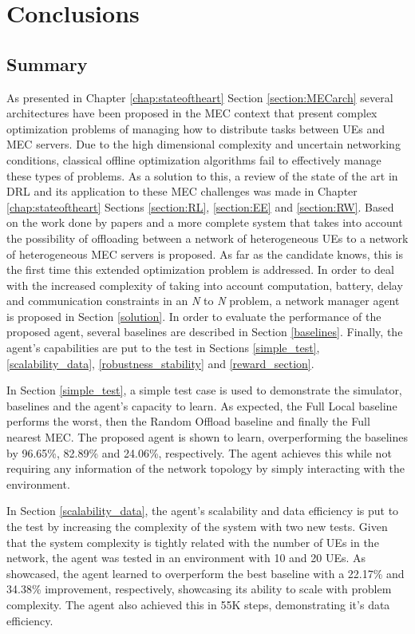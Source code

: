 \chapter{Conclusions}
\section{Summary}
\noindent As presented in Chapter \ref{chap:stateoftheart} Section \ref{section:MECarch} several architectures have been proposed in the \acrshort{MEC} context that present complex optimization problems of managing how to distribute tasks between \acrshort{UE}s and \acrshort{MEC} servers. Due to the high dimensional complexity and uncertain networking conditions, classical offline optimization algorithms fail to effectively manage these types of problems. As a solution to this, a review of the state of the art in \acrshort{DRL} and its application to these \acrshort{MEC} challenges was made in Chapter \ref{chap:stateoftheart} Sections \ref{section:RL}, \ref{section:EE} and \ref{section:RW}. Based on the work done by papers \cite{taskclass1} and \cite{NUE1mec} a more complete system that takes into account the possibility of offloading between a network of heterogeneous \acrshort{UE}s to a network of heterogeneous \acrshort{MEC} servers is proposed. As far as the candidate knows, this is the first time this extended optimization problem is addressed. In order to deal with the increased complexity of taking into account computation, battery, delay and communication constraints in an \emph{N} to \emph{N} problem, a network manager agent is proposed in Section \ref{solution}. In order to evaluate the performance of the proposed agent, several baselines are described in Section \ref{baselines}. Finally, the agent's capabilities are put to the test in Sections \ref{simple_test}, \ref{scalability_data}, \ref{robustness_stability} and \ref{reward_section}.

In Section \ref{simple_test}, a simple test case is used to demonstrate the simulator, baselines and the agent's capacity to learn. As expected, the Full Local baseline performs the worst, then the Random Offload baseline and finally the Full nearest MEC. The proposed agent is shown to learn, overperforming the baselines by 96.65\%, 82.89\% and 24.06\%, respectively. The agent achieves this while not requiring any information of the network topology by simply interacting with the environment.

In Section \ref{scalability_data}, the agent's scalability and data efficiency is put to the test by increasing the complexity of the system with two new tests. Given that the system complexity is tightly related with the number of \acrshort{UE}s in the network, the agent was tested in an environment with 10 and 20 \acrshort{UE}s. As showcased, the agent learned to overperform the best baseline with a 22.17\% and 34.38\% improvement, respectively, showcasing its ability to scale with problem complexity. The agent also achieved this in 55K steps, demonstrating it's data efficiency.

